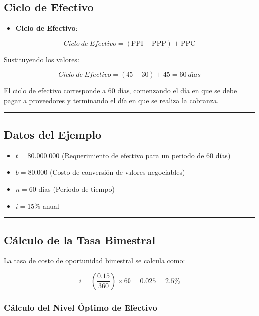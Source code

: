 \documentclass[
  letterpaper,
  DIV=11,
  numbers=noendperiod]{scrartcl}
\providecommand{\tightlist}{%
  \setlength{\itemsep}{0pt}\setlength{\parskip}{0pt}}\usepackage{longtable,booktabs,array}
\begin{document}
\subsection{Ciclo de Efectivo}\label{ciclo-de-efectivo}

\begin{itemize}
\tightlist
\item
  \textbf{Ciclo de Efectivo}:
\end{itemize}

\[
Ciclo\ de\ Efectivo = (\text{PPI} - \text{PPP}) + \text{PPC}
\]

Sustituyendo los valores:

\[
Ciclo\ de\ Efectivo = (45 - 30) + 45 = 60\ días
\]

El ciclo de efectivo corresponde a 60 días, comenzando el día en que se
debe pagar a proveedores y terminando el día en que se realiza la
cobranza.

\begin{center}\rule{0.5\linewidth}{0.5pt}\end{center}

\subsection{Datos del Ejemplo}\label{datos-del-ejemplo}

\begin{itemize}
\tightlist
\item
  \(t = 80.000.000\) (Requerimiento de efectivo para un periodo de 60
  días)
\item
  \(b = 80.000\) (Costo de conversión de valores negociables)
\item
  \(n = 60\) días (Periodo de tiempo)
\item
  \(i = 15\%\) anual
\end{itemize}

\begin{center}\rule{0.5\linewidth}{0.5pt}\end{center}

\subsection{Cálculo de la Tasa
Bimestral}\label{cuxe1lculo-de-la-tasa-bimestral}

La tasa de costo de oportunidad bimestral se calcula como:

\[
i = \left(\frac{0.15}{360}\right) \times 60 = 0.025 = 2.5\%
\]

\subsubsection{Cálculo del Nivel Óptimo de
Efectivo}\label{cuxe1lculo-del-nivel-uxf3ptimo-de-efectivo}
\end{document}
